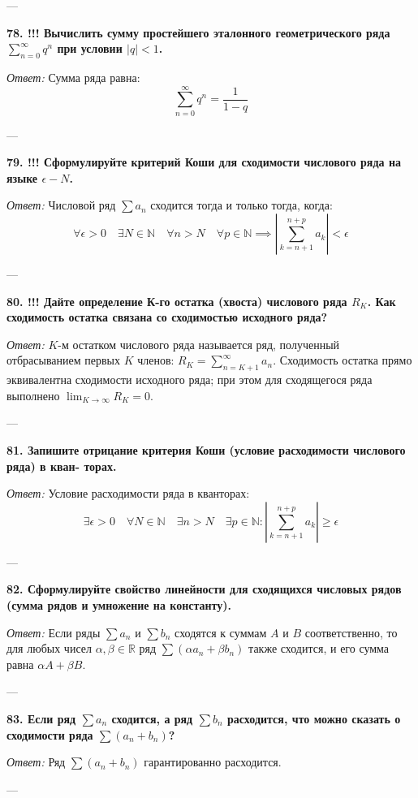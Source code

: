 \documentclass{article}
\begin{document}
---

\textbf{78. !!! Вычислить сумму простейшего эталонного геометрического ряда $\sum_{n=0}^{\infty}q^{n}$ при условии $|q|<1$.}

\textit{Ответ:} Сумма ряда равна:
$$ \sum_{n=0}^{\infty} q^n = \frac{1}{1-q} $$

---

\textbf{79. !!! Сформулируйте критерий Коши для сходимости числового ряда на языке $\epsilon-N$.}

\textit{Ответ:} Числовой ряд $\sum a_n$ сходится тогда и только тогда, когда:
$$ \forall \epsilon > 0 \quad \exists N \in \mathbb{N} \quad \forall n > N \quad \forall p \in \mathbb{N} \implies \left| \sum_{k=n+1}^{n+p} a_k \right| < \epsilon $$

---

\textbf{80. !!! Дайте определение К-го остатка (хвоста) числового ряда $R_{K}$. Как сходимость остатка связана со сходимостью исходного ряда?}

\textit{Ответ:} $K$-м остатком числового ряда называется ряд, полученный отбрасыванием первых $K$ членов: $R_K = \sum_{n=K+1}^{\infty} a_n$. Сходимость остатка прямо эквивалентна сходимости исходного ряда; при этом для сходящегося ряда выполнено $\lim_{K \to \infty} R_K = 0$.

---

\textbf{81. Запишите отрицание критерия Коши (условие расходимости числового ряда) в кван- торах.}

\textit{Ответ:} Условие расходимости ряда в кванторах:
$$ \exists \epsilon > 0 \quad \forall N \in \mathbb{N} \quad \exists n > N \quad \exists p \in \mathbb{N} : \left| \sum_{k=n+1}^{n+p} a_k \right| \ge \epsilon $$

---

\textbf{82. Сформулируйте свойство линейности для сходящихся числовых рядов (сумма рядов и умножение на константу).}

\textit{Ответ:} Если ряды $\sum a_n$ и $\sum b_n$ сходятся к суммам $A$ и $B$ соответственно, то для любых чисел $\alpha, \beta \in \mathbb{R}$ ряд $\sum (\alpha a_n + \beta b_n)$ также сходится, и его сумма равна $\alpha A + \beta B$.

---

\textbf{83. Если ряд $\sum a_{n}$ сходится, а ряд $\sum b_{n}$ расходится, что можно сказать о сходимости ряда $\sum(a_{n}+b_{n})$?}

\textit{Ответ:} Ряд $\sum(a_n + b_n)$ гарантированно расходится.

---
\end{document}
